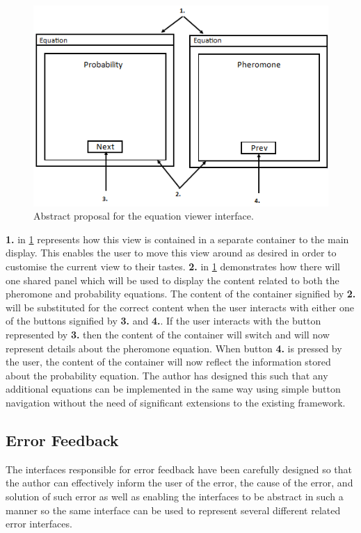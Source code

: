 \begin{figure}[H]
\centering
\includegraphics[scale=0.7]{Images/chapter4/pheroprobpanels}
\caption{Abstract proposal for the equation viewer interface.}
\label{fig:eqnViewImp}
\end{figure}

\textbf{1.} in \ref{fig:eqnViewImp} represents how this view is contained in a separate container to the main display. This enables the user to move this view around as desired in order to customise the current view to their tastes. \textbf{2.} in \ref{fig:eqnViewImp} demonstrates how there will one shared panel which will be used to display the content related to both the pheromone and probability equations. The content of the container signified by \textbf{2.} will be substituted for the correct content when the user interacts with either one of the buttons signified by \textbf{3.} and \textbf{4.}. If the user interacts with the button represented by \textbf{3.} then the content of the container will switch and will now represent details about the pheromone equation. When button \textbf{4.} is pressed by the user, the content of the container will now reflect the information stored about the probability equation. The author has designed this such that any additional equations can be implemented in the same way using simple button navigation without the need of significant extensions to the existing framework.

\subsection{Error Feedback}
The interfaces responsible for error feedback have been carefully designed so that the author can effectively inform the user of the error, the cause of the error, and solution of such error as well as enabling the interfaces to be abstract in such a manner so the same interface can be used to represent several different related error interfaces.

